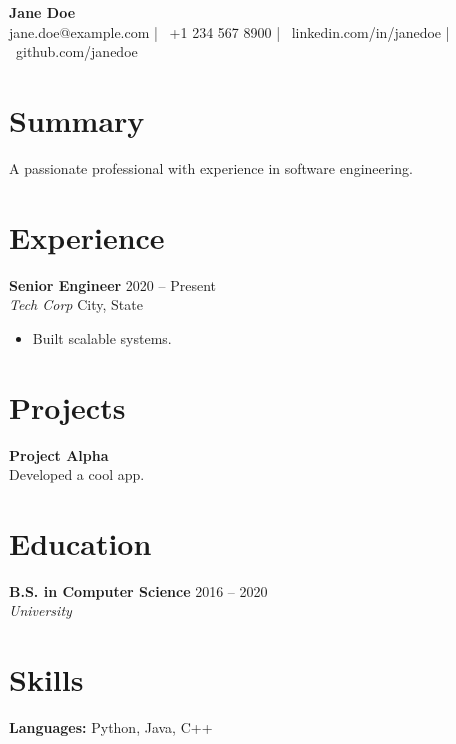\documentclass[11pt,a4paper]{article}
\begin{document}
\begin{center}
    {\Huge \textbf{Jane Doe}} \\
    \vspace{1mm}
    {{\footnotesize jane.doe@example.com | \faPhone\ +1 234 567 8900 | \faLinkedin\ linkedin.com/in/janedoe | \faGithub\ github.com/janedoe}}
\end{center}

\vspace{2mm}

\section*{Summary}
{\footnotesize A passionate professional with experience in software engineering.}

\section*{Experience}
\textbf{Senior Engineer} \hfill 2020 -- Present \\ \textit{Tech Corp} \hfill City, State \begin{itemize}[noitemsep] \footnotesize \item Built scalable systems. \end{itemize}

\section*{Projects}
\textbf{Project Alpha} \\ {\footnotesize Developed a cool app.}

\section*{Education}
\textbf{B.S. in Computer Science} \hfill 2016 -- 2020 \\ \textit{University}

\section*{Skills}
\textbf{Languages:} Python, Java, C++
\end{document}
